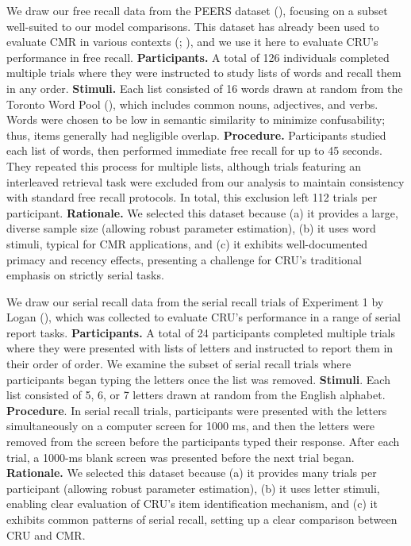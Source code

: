 \documentclass[
  man,
  floatsintext,
  longtable,
  nolmodern,
  notxfonts,
  notimes,
  draftfirst,
  colorlinks=true,linkcolor=blue,citecolor=blue,urlcolor=blue]{apa7}
\begin{document}
We draw our free recall data from the PEERS dataset
(), focusing on a
subset well-suited to our model comparisons. This dataset has already
been used to evaluate CMR in various contexts
(;
), and we use
it here to evaluate CRU's performance in free recall.
\textbf{Participants.} A total of 126 individuals completed multiple
trials where they were instructed to study lists of words and recall
them in any order. \textbf{Stimuli.} Each list consisted of 16 words
drawn at random from the Toronto Word Pool
(), which
includes common nouns, adjectives, and verbs. Words were chosen to be
low in semantic similarity to minimize confusability; thus, items
generally had negligible overlap. \textbf{Procedure.} Participants
studied each list of words, then performed immediate free recall for up
to 45 seconds. They repeated this process for multiple lists, although
trials featuring an interleaved retrieval task were excluded from our
analysis to maintain consistency with standard free recall protocols. In
total, this exclusion left 112 trials per participant.
\textbf{Rationale.} We selected this dataset because (a) it provides a
large, diverse sample size (allowing robust parameter estimation), (b)
it uses word stimuli, typical for CMR applications, and (c) it exhibits
well-documented primacy and recency effects, presenting a challenge for
CRU's traditional emphasis on strictly serial tasks.

We draw our serial recall data from the serial recall trials of
Experiment 1 by Logan (), which was
collected to evaluate CRU's performance in a range of serial report
tasks. \textbf{Participants.} A total of 24 participants completed
multiple trials where they were presented with lists of letters and
instructed to report them in their order of order. We examine the subset
of serial recall trials where participants began typing the letters once
the list was removed. \textbf{Stimuli}. Each list consisted of 5, 6, or
7 letters drawn at random from the English alphabet. \textbf{Procedure}.
In serial recall trials, participants were presented with the letters
simultaneously on a computer screen for 1000 ms, and then the letters
were removed from the screen before the participants typed their
response. After each trial, a 1000-ms blank screen was presented before
the next trial began. \textbf{Rationale.} We selected this dataset
because (a) it provides many trials per participant (allowing robust
parameter estimation), (b) it uses letter stimuli, enabling clear
evaluation of CRU's item identification mechanism, and (c) it exhibits
common patterns of serial recall, setting up a clear comparison between
CRU and CMR.
\end{document}
